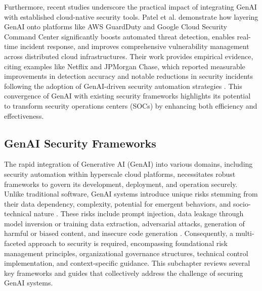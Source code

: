 Furthermore, recent studies underscore the practical impact of integrating GenAI with established cloud-native security tools. Patel et al. \cite{patel_generative_2025} demonstrate how layering GenAI onto platforms like AWS GuardDuty and Google Cloud Security Command Center significantly boosts automated threat detection, enables real-time incident response, and improves comprehensive vulnerability management across distributed cloud infrastructures. Their work provides empirical evidence, citing examples like Netflix and JPMorgan Chase, which reported measurable improvements in detection accuracy and notable reductions in security incidents following the adoption of GenAI-driven security automation strategies \cite{patel_generative_2025}. This convergence of GenAI with existing security frameworks highlights its potential to transform security operations centers (SOCs) by enhancing both efficiency and effectiveness.


\subsection{GenAI Security Frameworks}
\label{sec:GenAI Security Frameworks}

The rapid integration of Generative AI (GenAI) into various domains, including security automation within hyperscale cloud platforms, necessitates robust frameworks to govern its development, deployment, and operation securely. Unlike traditional software, GenAI systems introduce unique risks stemming from their data dependency, complexity, potential for emergent behaviors, and socio-technical nature \cite{tabassi_artificial_2023}. These risks include prompt injection, data leakage through model inversion or training data extraction, adversarial attacks, generation of harmful or biased content, and insecure code generation \cite{haryanto_secgenai_2024, hansen_introducing_2023}. Consequently, a multi-faceted approach to security is required, encompassing foundational risk management principles, organizational governance structures, technical control implementation, and context-specific guidance. This subchapter reviews several key frameworks and guides that collectively address the challenge of securing GenAI systems.

